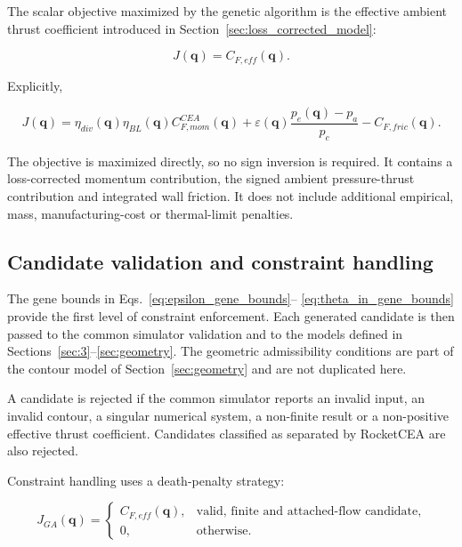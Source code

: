 The scalar objective maximized by the genetic algorithm is the effective ambient
thrust coefficient introduced in Section~\ref{sec:loss_corrected_model}:

\begin{equation}
\boxed{
J(\bm{q})
=
C_{F,eff}(\bm{q})
}.
\label{eq:implemented_ga_fitness}
\end{equation}

Explicitly,

\begin{equation}
J(\bm{q})
=
\eta_{div}(\bm{q})\eta_{BL}(\bm{q})
C_{F,mom}^{CEA}(\bm{q})
+
\varepsilon(\bm{q})
\frac{p_e(\bm{q})-p_a}{p_c}
-C_{F,fric}(\bm{q}).
\label{eq:expanded_ga_fitness}
\end{equation}

The objective is maximized directly, so no sign inversion is required. It contains a
loss-corrected momentum contribution, the signed ambient pressure-thrust contribution
and integrated wall friction. It does not include additional empirical, mass,
manufacturing-cost or thermal-limit penalties.

\subsection{Candidate validation and constraint handling}

The gene bounds in Eqs.~\eqref{eq:epsilon_gene_bounds}--%
\eqref{eq:theta_in_gene_bounds} provide the first level of constraint enforcement.
Each generated candidate is then passed to the common simulator validation and to the
models defined in Sections~\ref{sec:3}--\ref{sec:geometry}. The geometric
admissibility conditions are part of the contour model of
Section~\ref{sec:geometry} and are not duplicated here.

A candidate is rejected if the common simulator reports an invalid input, an invalid
contour, a singular numerical system, a non-finite result or a non-positive effective
thrust coefficient. Candidates classified as separated by RocketCEA are also rejected.

Constraint handling uses a death-penalty strategy:

\begin{equation}
J_{GA}(\bm{q})
=
\begin{cases}
C_{F,eff}(\bm{q}),
&\text{valid, finite and attached-flow candidate},\\[1.5mm]
0,
&\text{otherwise}.
\end{cases}
\label{eq:ga_death_penalty}
\end{equation}

